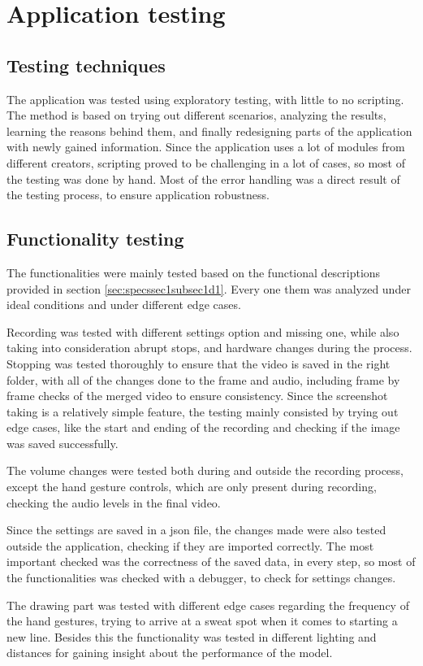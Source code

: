\chapter{Application testing}
\label{chap:testing}

\section{Testing techniques}
\label{sec:testingsec1}

\par The application was tested using exploratory testing, with little to no scripting. The method is based on trying out different scenarios, analyzing the results, learning the reasons behind them, and finally redesigning parts of the application with newly gained information. Since the application uses a lot of modules from different creators, scripting proved to be challenging in a lot of cases, so most of the testing was done by hand. Most of the error handling was a direct result of the testing process, to ensure application robustness.

\section{Functionality testing}
\label{sec:testingsec2}

\par The functionalities were mainly tested based on the functional descriptions provided in section \ref{sec:specssec1subsec1d1}. Every one them was analyzed under ideal conditions and under different edge cases. 
\par Recording was tested with different settings option and missing one, while also taking into consideration abrupt stops, and hardware changes during the process. Stopping was tested thoroughly to ensure that the video is saved in the right folder, with all of the changes done to the frame and audio, including frame by frame checks of the merged video to ensure consistency. Since the screenshot taking is a relatively simple feature, the testing mainly consisted by trying out edge cases, like the start and ending of the recording and checking if the image was saved successfully. 
\par The volume changes were tested both during and outside the recording process, except the hand gesture controls, which are only present during recording, checking the audio levels in the final video.
\par Since the settings are saved in a json file, the changes made were also tested outside the application, checking if they are imported correctly. The most important checked was the correctness of the saved data, in every step, so most of the functionalities was checked with a debugger, to check for settings changes.
\par The drawing part was tested with different edge cases regarding the frequency of the hand gestures, trying to arrive at a sweat spot when it comes to starting a new line. Besides this the functionality was tested in different lighting and distances for gaining insight about the performance of the model.

